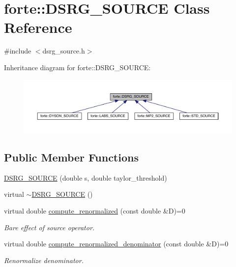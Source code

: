 \hypertarget{classforte_1_1_d_s_r_g___s_o_u_r_c_e}{}\section{forte\+:\+:D\+S\+R\+G\+\_\+\+S\+O\+U\+R\+CE Class Reference}
\label{classforte_1_1_d_s_r_g___s_o_u_r_c_e}


{\ttfamily \#include $<$dsrg\+\_\+source.\+h$>$}



Inheritance diagram for forte\+:\+:D\+S\+R\+G\+\_\+\+S\+O\+U\+R\+CE\+:
\nopagebreak
\begin{figure}[H]
\begin{center}
\leavevmode
\includegraphics[width=350pt]{classforte_1_1_d_s_r_g___s_o_u_r_c_e__inherit__graph}
\end{center}
\end{figure}
\subsection*{Public Member Functions}
\begin{DoxyCompactItemize}
\item 
\mbox{\hyperlink{classforte_1_1_d_s_r_g___s_o_u_r_c_e_a755f7db2ada7a0028f8b6427990d66e0}{D\+S\+R\+G\+\_\+\+S\+O\+U\+R\+CE}} (double s, double taylor\+\_\+threshold)
\item 
virtual \mbox{\hyperlink{classforte_1_1_d_s_r_g___s_o_u_r_c_e_ab0dfae33a0b08a20312e593cb0af338e}{$\sim$\+D\+S\+R\+G\+\_\+\+S\+O\+U\+R\+CE}} ()
\item 
virtual double \mbox{\hyperlink{classforte_1_1_d_s_r_g___s_o_u_r_c_e_a8b4c4428bb50af4561c256e3180f6b31}{compute\+\_\+renormalized}} (const double \&D)=0
\begin{DoxyCompactList}\small\item\em Bare effect of source operator. \end{DoxyCompactList}\item 
virtual double \mbox{\hyperlink{classforte_1_1_d_s_r_g___s_o_u_r_c_e_a7345ba63c3612369be7c4cc896b7d5c4}{compute\+\_\+renormalized\+\_\+denominator}} (const double \&D)=0
\begin{DoxyCompactList}\small\item\em Renormalize denominator. \end{DoxyCompactList}\end{DoxyCompactItemize}
